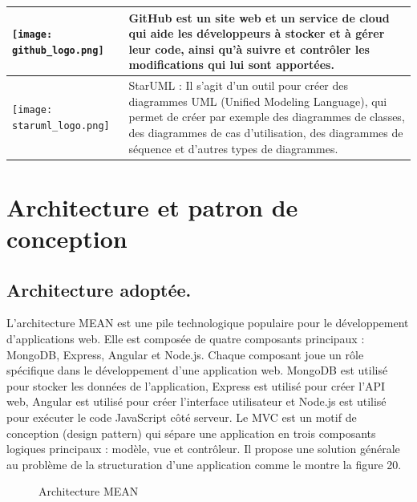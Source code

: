 \begin{longtable}[c]{
        |p{}
        |p{}|
    }
        \hline
        \texttt{[image: github\_logo.png]} & GitHub est un site web et un service de cloud qui aide les développeurs à stocker et à gérer leur code, ainsi qu’à suivre et contrôler les modifications qui lui sont apportées. \\
        \hline
        \texttt{[image: staruml\_logo.png]} & StarUML : Il s'agit d'un outil pour créer des diagrammes UML (Unified Modeling Language), qui permet de créer par exemple des diagrammes de classes, des diagrammes de cas d'utilisation, des diagrammes de séquence et d'autres types de diagrammes. \\
        \hline
    \end{longtable}


\section{Architecture et patron de conception }
    \subsection{Architecture adoptée.  } 
    L'architecture MEAN est une pile technologique populaire pour le développement d'applications web. Elle est composée de quatre composants principaux : MongoDB, Express, Angular et Node.js. Chaque composant joue un rôle spécifique dans le développement d'une application web. MongoDB est utilisé pour stocker les données de l'application, Express est utilisé pour créer l'API web, Angular est utilisé pour créer l'interface utilisateur et Node.js est utilisé pour exécuter le code JavaScript côté serveur.
    Le MVC est un motif de conception (design pattern) qui sépare une application en trois composants logiques principaux : modèle, vue et contrôleur. Il propose une solution générale au problème de la structuration d’une application comme le montre la figure 20.
    
    \begin{figure}[H]
        \centering
        \caption{Architecture MEAN }
        \label{fig:logo_tt}
    \end{figure}
